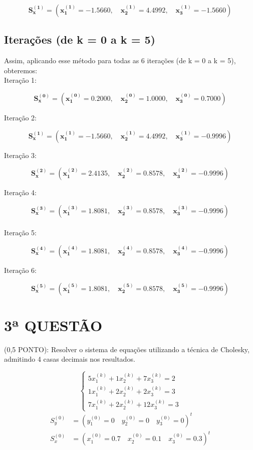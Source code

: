 \documentclass[12pt,a4paper]{article}
\begin{document}
\[
\boldsymbol{S_x^{(1)}} =
(
\boldsymbol{x_1^{(1)}} = -1.5660,\quad
\boldsymbol{x_2^{(1)}} = 4.4992,\quad
\boldsymbol{x_3^{(1)}} = -1.5660
)
\]

\subsection{Iterações (de k = 0 a k = 5)}
Assim, aplicando esse método para todas as 6 iterações (de k = 0 a k = 5), obteremos: \\

Iteração 1:

\[
\boldsymbol{S_x^{(0)}} =
\left(
\boldsymbol{x_1^{(0)}} = 0.2000, \quad
\boldsymbol{x_2^{(0)}} = 1.0000, \quad
\boldsymbol{x_3^{(0)}} = 0.7000
\right)
\]

Iteração 2:

\[
\boldsymbol{S_x^{(1)}} =
\left(
\boldsymbol{x_1^{(1)}} = -1.5660, \quad
\boldsymbol{x_2^{(1)}} = 4.4992, \quad
\boldsymbol{x_3^{(1)}} = -0.9996
\right)
\]

Iteração 3:

\[
\boldsymbol{S_x^{(2)}} =
\left(
\boldsymbol{x_1^{(2)}} = 2.4135, \quad
\boldsymbol{x_2^{(2)}} = 0.8578, \quad
\boldsymbol{x_3^{(2)}} = -0.9996
\right)
\]

Iteração 4:

\[
\boldsymbol{S_x^{(3)}} =
\left(
\boldsymbol{x_1^{(3)}} = 1.8081, \quad
\boldsymbol{x_2^{(3)}} = 0.8578, \quad
\boldsymbol{x_3^{(3)}} = -0.9996
\right)
\] \\

Iteração 5:

\[
\boldsymbol{S_x^{(4)}} =
\left(
\boldsymbol{x_1^{(4)}} = 1.8081, \quad
\boldsymbol{x_2^{(4)}} = 0.8578, \quad
\boldsymbol{x_3^{(4)}} = -0.9996
\right)
\]

 Iteração 6:

\[
\boldsymbol{S_x^{(5)}} =
\left(
\boldsymbol{x_1^{(5)}} = 1.8081, \quad
\boldsymbol{x_2^{(5)}} = 0.8578, \quad
\boldsymbol{x_3^{(5)}} = -0.9996
\right)
\]

\newpage

\noindent \section{3ª QUESTÃO} (0,5 PONTO): Resolver o sistema de equações utilizando a técnica de Cholesky, admitindo 4 casas decimais nos resultados.

\[
\begin{cases}
5x_1^{(k)} + 1x_2^{(k)} + 7x_3^{(k)} = 2 \\
1x_1^{(k)} + 2x_2^{(k)} + 2x_3^{(k)} = 3 \\
7x_1^{(k)} + 2x_2^{(k)} + 12x_3^{(k)} = 3
\end{cases}
\]
\begin{align*}
S_y^{(0)} &= ( y_1^{(0)} = 0 \quad y_2^{(0)} = 0 \quad y_3^{(0)} = 0 )^{t} \\
S_x^{(0)} &= ( x_1^{(0)} = 0.7 \quad x_2^{(0)} = 0.1 \quad x_3^{(0)} = 0.3 )^{t}
\end{align*}
\end{document}
